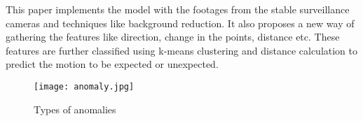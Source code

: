 This paper implements the model with the footages from the stable surveillance cameras and techniques like background reduction. It also proposes a new way of gathering the features like direction, change in the points, distance etc. These features are further classified using k-means clustering and distance calculation to predict the motion to be expected or unexpected.

\begin{figure}[tb]
	\center\texttt{[image: anomaly.jpg]}
	\caption{Types of anomalies}
	\label{fig:anomaly}
\end{figure}


 

 
